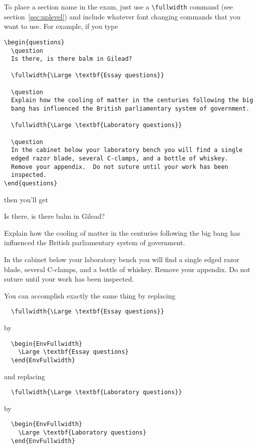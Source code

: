 \documentclass[12pt]{exam}
\begin{document}
To place a section name in the exam, just use a \verb"\fullwidth"
command (see section~\ref{sec:uplevel}) and include whatever font
changing commands that you want to use.  For example, if you type
\begin{verbatim}
\begin{questions}
  \question
  Is there, is there balm in Gilead?

  \fullwidth{\Large \textbf{Essay questions}}
  
  \question
  Explain how the cooling of matter in the centuries following the big
  bang has influenced the British parliamentary system of government.

  \fullwidth{\Large \textbf{Laboratory questions}}

  \question
  In the cabinet below your laboratory bench you will find a single
  edged razor blade, several C-clamps, and a bottle of whiskey.
  Remove your appendix.  Do not suture until your work has been
  inspected.
\end{questions}
\end{verbatim}
then you'll get
\begin{questions}
  \question
  Is there, is there balm in Gilead?

  
  \question
  Explain how the cooling of matter in the centuries following the big
  bang has influenced the British parliamentary system of government.


  \question
  In the cabinet below your laboratory bench you will find a single
  edged razor blade, several C-clamps, and a bottle of whiskey.
  Remove your appendix.  Do not suture until your work has been
  inspected.
\end{questions}
You can accomplish exactly the same thing by replacing
\begin{verbatim}
  \fullwidth{\Large \textbf{Essay questions}}
\end{verbatim}
by
\begin{verbatim}
  \begin{EnvFullwidth}
    \Large \textbf{Essay questions}
  \end{EnvFullwidth}
\end{verbatim}
and replacing
\begin{verbatim}
  \fullwidth{\Large \textbf{Laboratory questions}}
\end{verbatim}
by
\begin{verbatim}
  \begin{EnvFullwidth}
    \Large \textbf{Laboratory questions}
  \end{EnvFullwidth}
\end{verbatim}
\end{document}
